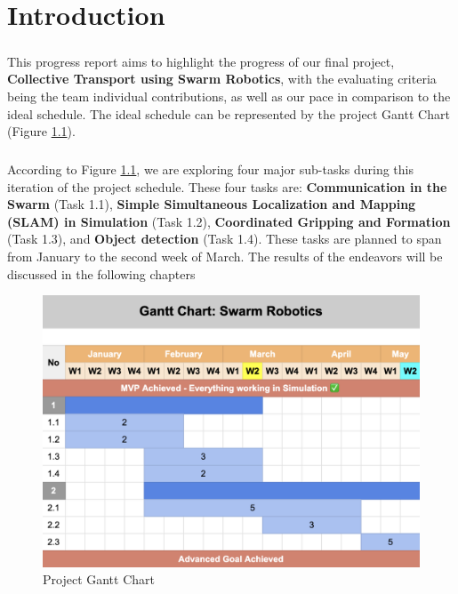 \chapter{Introduction}

\paragraph*{}
This progress report aims to highlight the progress of our final project, \textbf{Collective Transport using Swarm Robotics}, with the evaluating criteria being the team individual contributions, as well as our pace in comparison to the ideal schedule. The ideal schedule can be represented by the project Gantt Chart (Figure \ref{fig:gantt_chart}).

\paragraph*{}
According to Figure \ref{fig:gantt_chart}, we are exploring four major sub-tasks during this iteration of the project schedule. These four tasks are: \textbf{Communication in the Swarm} (Task 1.1), \textbf{Simple Simultaneous Localization and Mapping (SLAM) in Simulation} (Task 1.2), \textbf{Coordinated Gripping and Formation} (Task 1.3), and \textbf{Object detection} (Task 1.4). These tasks are planned to span from January to the second week of March. The results of the endeavors will be discussed in the following chapters

\begin{figure}[H]
    \centering
    \includegraphics[width=1\linewidth]{assets/images/timeline/gantt_chart.png}
    \caption{Project Gantt Chart}
    \label{fig:gantt_chart}
\end{figure}

